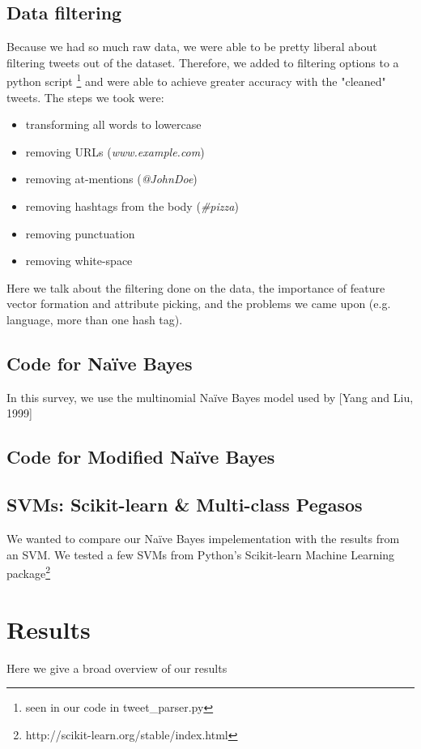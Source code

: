 \documentclass[11pt,letterpaper]{article}
\begin{document}
\subsection{Data filtering}
Because we had so much raw data, we were able to be pretty liberal about filtering tweets out of the dataset. Therefore, we added to filtering options to a python script \footnote{seen in our code in tweet\_parser.py} and were able to achieve greater accuracy with the "cleaned" tweets. The steps we took were:
\begin{itemize}
\item transforming all words to lowercase
\item removing URLs (\textit{www.example.com})
\item removing at-mentions (\textit{@JohnDoe})
\item removing hashtags from the body (\textit{\#pizza})
\item removing punctuation
\item removing white-space
\end{itemize}

Here we talk about the filtering done on the data, the importance of feature vector formation and attribute picking, and the problems we came upon (e.g. language, more than one hash tag).

\subsection{Code for Na{\"i}ve Bayes}
  In this survey, we use the multinomial Na{\"i}ve Bayes model used by [Yang and Liu, 1999]

\subsection{Code for Modified Na{\"i}ve Bayes}

\subsection{SVMs: Scikit-learn \& Multi-class Pegasos}
We wanted to compare our Na{\"i}ve Bayes impelementation with the results from an SVM. We tested a few SVMs from Python's Scikit-learn Machine Learning package\footnote{http://scikit-learn.org/stable/index.html} 

\section{Results}
Here we give a broad overview of our results
\end{document}

